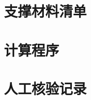 \documentclass[withoutpreface,bwprint]{cumcmthesis}
\begin{document}
\clearpage
\begin{appendices}

\section{支撑材料清单}


\section{计算程序}


\section{人工核验记录}


\end{appendices}
\end{document}
